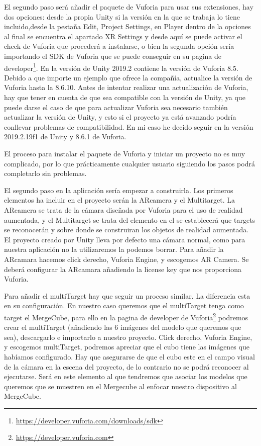 El segundo paso será añadir el paquete de Vuforia para usar sus extensiones, hay dos opciones: desde la propia Unity si la versión en la que se trabaja lo tiene incluido,desde la pestaña Edit, Project Settings, en Player dentro de la opciones al final se encuentra el apartado XR Settings y desde aquí se puede activar el check de Vuforia que procederá a instalarse, o bien la segunda opción sería importando el SDK de Vuforia que se puede conseguir en su pagina de developer\footnote{\url{https://developer.vuforia.com/downloads/sdk}}. En la versión de Unity 2019.2 contiene la versión  de Vuforia 8.5.
Debido a que importe un ejemplo que ofrece la compañía, actualice la versión de Vuforia hasta la 8.6.10. Antes de intentar realizar una actualización de Vuforia, hay que tener en cuenta de que sea compatible con la versión de Unity, ya que puede darse el caso de que para actualizar Vuforia sea necesario también actualizar la versión de Unity, y esto si el proyecto ya está avanzado podría conllevar problemas de compatibilidad.
En mi caso he decido seguir en la versión 2019.2.19f1 de Unity y 8.6.1 de Vuforia.

El proceso para instalar el paquete de Vuforia y iniciar un proyecto no es muy complicado, por lo que prácticamente cualquier usuario siguiendo los pasos podrá completarlo sin problemas.

El segundo paso en la aplicación sería empezar a construirla. 
Los primeros elementos ha incluir en el proyecto serán la ARcamera y el Multitarget.
La ARcamera se trata de la cámara diseñada por Vuforia para el uso de realidad aumentada, y el Multitarget se trata del elemento en el se establecerá que targets se reconocerán y sobre donde se construiran los objetos de realidad aumentada.
El proyecto creado por Unity lleva por defecto una cámara normal, como para nuestra aplicación no la utilizaremos la podemos borrar.
Para añadir la ARcamara hacemos click derecho, Vuforia Engine, y escogemos AR Camera. Se deberá configurar la ARcamara añadiendo la license key que nos proporciona Vuforia.

Para añadir el multiTarget hay que seguir un proceso similar. La diferencia esta en su configuración. En nuestro caso queremos que el multiTarget tenga como target el MergeCube, para ello en la pagina de developer de Vuforia\footnote{\url{https://developer.vuforia.com}} podremos crear el multiTarget (añadiendo las 6 imágenes del modelo que queremos que sea), descargarlo e importarlo a nuestro proyecto. 
Click derecho, Vuforia Engine, y escogemos multiTarget, podremos apreciar que el cubo tiene las imágenes que habíamos configurado. Hay que asegurarse de que el cubo este en el campo visual de la cámara en la escena del proyecto, de lo contrario no se podrá reconocer al ejecutarse. Será en este elemento al que tendremos que asociar los modelos que queremos que se muestren en el Mergecube al enfocar nuestro dispositivo al MergeCube.

